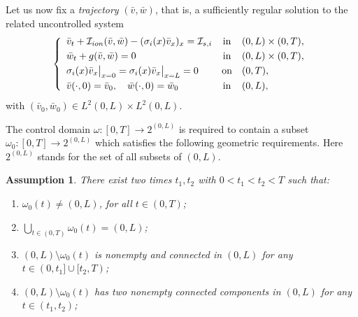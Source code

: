 \documentclass[10pt]{article}
\newtheorem{Assumption}{Assumption}
\def\dis{\displaystyle}
\def\om{\omega}
\def\\Phivec{\mathbf{\Phi}}
\begin{document}

  	Let us now fix a {\it trajectory} $(\bar{v},\bar{w})$, that is,
    a sufficiently regular solution to the related uncontrolled system\,
\begin{equation}\label{eq:monoTraj}
    \left\{
        \begin{array}{lcl}
        \bar v_t+\mathcal{I}_{ion}(\bar v,\bar w)
        -(\sigma_i(x)\bar  v_x)_x
        =\mathcal{I}_{s,i}            &\mbox{in}&(0,L) \times (0,T),    \\
        \noalign{\smallskip}\dis
        \bar w_t   +g(\bar v,\bar w)= 0         &\mbox{in}&(0,L) \times (0,T),    \\
        \noalign{\smallskip}\dis
        \sigma_i(x)\bar v_x\big|_{x=0}=\sigma_i(x)\bar v_x\big|_{x=L} = 0    &\mbox{on}&(0,T),            \\
        \noalign{\smallskip}\dis
        \bar v(\cdot,0) =\bar v_0,\quad \bar w(\cdot,0) =\bar w_0           &\mbox{in}&(0,L),
        \end{array}
    \right.
\end{equation}
    with $(\bar v_0,\bar w_0)\in L^2(0,L)\times L^2(0,L)$.

	The control domain $\om:[0,T]\rightarrow 2^{(0,L)}$ is required  to contain  a subset $\om_0:[0,T]\rightarrow 2^{(0,L)}$ which satisfies the following
	geometric requirements. Here $2^{(0,L)}$ stands for the set of all subsets of $(0, L)$.


\begin{Assumption}\label{AssumptionMC}
      There exist  two times $t_1,t_2$ with $0< t_1 < t_2 < T $ such that:
\begin{enumerate}
    \item[a)]  $\om_0(t)\neq(0,L)$, for all $t\in(0,T)$;
    \item[b)]  $\bigcup\limits_{t\in(0,T)}\om_0(t)=(0,L)$;
    \item[c)] $(0,L)\setminus\om_0(t)$ is nonempty and connected in $(0,L)$ for any $t\in (0,t_1]\cup [t_2,T)$;
    \item[d)]$(0,L)\setminus \om_0(t)$ has two nonempty connected components in $(0,L)$ for any  $t\in (t_1,t_2)$;
\end{enumerate}
\end{Assumption}
\end{document}
